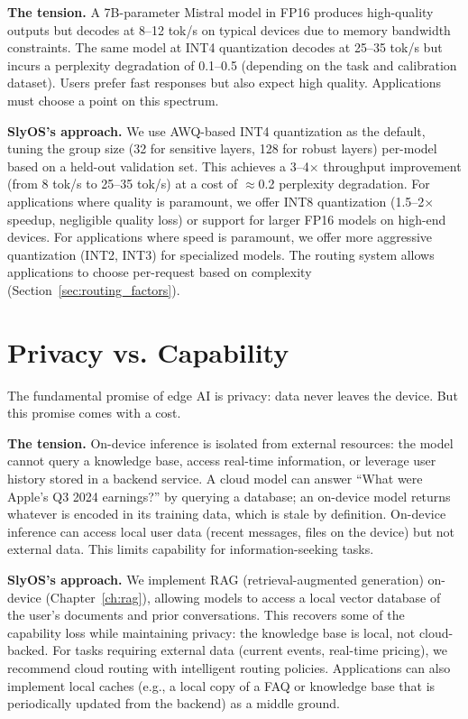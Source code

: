 \documentclass[12pt, letterpaper, twoside]{report}
\begin{document}
\textbf{The tension.} A 7B-parameter Mistral model in FP16 produces high-quality outputs but decodes at 8--12 tok/s on typical devices due to memory bandwidth constraints. The same model at INT4 quantization decodes at 25--35 tok/s but incurs a perplexity degradation of 0.1--0.5 (depending on the task and calibration dataset). Users prefer fast responses but also expect high quality. Applications must choose a point on this spectrum.

\textbf{SlyOS's approach.} We use AWQ-based INT4 quantization as the default, tuning the group size (32 for sensitive layers, 128 for robust layers) per-model based on a held-out validation set. This achieves a 3--4$\times$ throughput improvement (from 8 tok/s to 25--35 tok/s) at a cost of $\approx$0.2 perplexity degradation. For applications where quality is paramount, we offer INT8 quantization (1.5--2$\times$ speedup, negligible quality loss) or support for larger FP16 models on high-end devices. For applications where speed is paramount, we offer more aggressive quantization (INT2, INT3) for specialized models. The routing system allows applications to choose per-request based on complexity (Section~\ref{sec:routing_factors}).

\section{Privacy vs. Capability}
\label{sec:privacy_capability}

The fundamental promise of edge AI is privacy: data never leaves the device. But this promise comes with a cost.

\textbf{The tension.} On-device inference is isolated from external resources: the model cannot query a knowledge base, access real-time information, or leverage user history stored in a backend service. A cloud model can answer ``What were Apple's Q3 2024 earnings?'' by querying a database; an on-device model returns whatever is encoded in its training data, which is stale by definition. On-device inference can access local user data (recent messages, files on the device) but not external data. This limits capability for information-seeking tasks.

\textbf{SlyOS's approach.} We implement RAG (retrieval-augmented generation) on-device (Chapter~\ref{ch:rag}), allowing models to access a local vector database of the user's documents and prior conversations. This recovers some of the capability loss while maintaining privacy: the knowledge base is local, not cloud-backed. For tasks requiring external data (current events, real-time pricing), we recommend cloud routing with intelligent routing policies. Applications can also implement local caches (e.g., a local copy of a FAQ or knowledge base that is periodically updated from the backend) as a middle ground.
\end{document}
